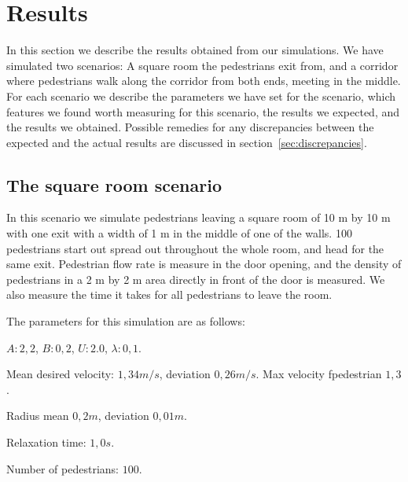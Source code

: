 \section{Results}
\label{sec:results}

In this section we describe the results obtained from our simulations. We have 
simulated two scenarios: A square room the pedestrians exit from, and a 
corridor where pedestrians walk along the corridor from both ends, meeting in 
the middle. For each scenario we describe the parameters we have set for the 
scenario, which features we found worth measuring for this scenario, the 
results we expected, and the results we obtained. Possible remedies for any 
discrepancies between the expected and the actual results are discussed in 
section~\ref{sec:discrepancies}.

\subsection{The square room scenario}
In this scenario we simulate pedestrians leaving a square room of 10 m by 10 m 
with one exit with a width of 1 m in the middle of one of the walls. 100 
pedestrians start out spread out throughout the whole room, and head for the 
same exit. Pedestrian flow rate is measure in the door opening, and the 
density of pedestrians in a 2 m by 2 m area directly in front of the door is 
measured. We also measure the time it takes for all pedestrians to leave the room.

The parameters for this simulation are as follows:

\begin{itemize*}
    \item $A: 2,2$, $B: 0,2$, $U: 2.0$, $\lambda: 0,1$.
    \item Mean desired velocity: $1,34 m/s$, deviation $0,26 m/s$. Max 
        velocity fpedestrian $1,3$.
    \item Radius mean $0,2 m$, deviation $0,01 m$.
    \item Relaxation time: $1,0 s$.
    \item Number of pedestrians: $100$.
\end{itemize*}



